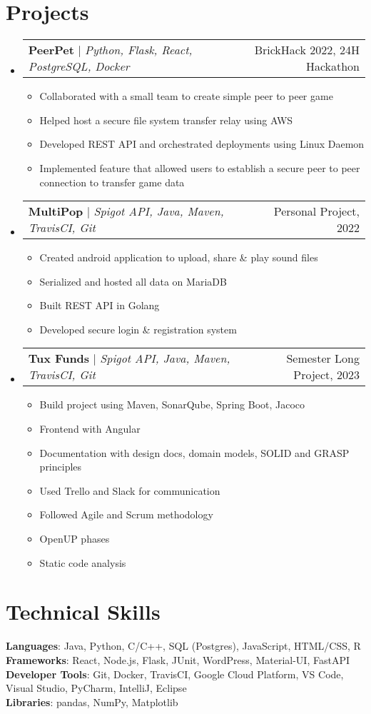 \documentclass[letterpaper,11pt]{article}
\makeatletter
\newcommand{\resumeItem}[1]{
  \item\small{
    {#1 \vspace{-2pt}}
  }
}
\newcommand{\resumeProjectHeading}[2]{
    \item
    \begin{tabular*}{0.97\textwidth}{l@{\extracolsep{\fill}}r}
      \small#1 & #2 \\
    \end{tabular*}\vspace{-7pt}
}
\newcommand{\resumeSubHeadingListStart}{\begin{itemize}[leftmargin=0.15in, label={}]}
\newcommand{\resumeSubHeadingListEnd}{\end{itemize}}
\newcommand{\resumeItemListStart}{\begin{itemize}}
\newcommand{\resumeItemListEnd}{\end{itemize}\vspace{-5pt}}
\makeatother
\begin{document}
\section{Projects}
\resumeSubHeadingListStart
    \resumeProjectHeading
        {\textbf{PeerPet} $|$ \emph{Python, Flask, React, PostgreSQL, Docker}}{BrickHack 2022, 24H Hackathon}
    \resumeItemListStart
        \resumeItem{Collaborated with a small team to create simple peer to peer game}
        \resumeItem{Helped host a secure file system transfer relay using AWS}
        \resumeItem{Developed REST API and orchestrated deployments using Linux Daemon}
        \resumeItem{Implemented feature that allowed users to establish a secure peer to peer connection to transfer game data}
    \resumeItemListEnd
    \resumeProjectHeading
        {\textbf{MultiPop} $|$ \emph{Spigot API, Java, Maven, TravisCI, Git}}{Personal Project, 2022}
    \resumeItemListStart
        \resumeItem{Created android application to upload, share & play sound files}
        \resumeItem{Serialized and hosted all data on MariaDB}
        \resumeItem{Built REST API in Golang}
        \resumeItem{Developed secure login & registration system}
    \resumeItemListEnd
    \resumeProjectHeading
        {\textbf{Tux Funds} $|$ \emph{Spigot API, Java, Maven, TravisCI, Git}}{Semester Long Project, 2023}
    \resumeItemListStart
        \resumeItem{Build project using Maven, SonarQube, Spring Boot, Jacoco}
        \resumeItem{Frontend with Angular}
        \resumeItem{Documentation with design docs, domain models, SOLID and GRASP principles}
        \resumeItem{Used Trello and Slack for communication}
        \resumeItem{Followed Agile and Scrum methodology}
        \resumeItem{OpenUP phases}
        \resumeItem{Static code analysis}
    \resumeItemListEnd
\resumeSubHeadingListEnd



%
\section{Technical Skills}
 \begin{itemize}[leftmargin=0.15in, label={}]
    \small{\item{
     \textbf{Languages}{: Java, Python, C/C++, SQL (Postgres), JavaScript, HTML/CSS, R} \\
     \textbf{Frameworks}{: React, Node.js, Flask, JUnit, WordPress, Material-UI, FastAPI} \\
     \textbf{Developer Tools}{: Git, Docker, TravisCI, Google Cloud Platform, VS Code, Visual Studio, PyCharm, IntelliJ, Eclipse} \\
     \textbf{Libraries}{: pandas, NumPy, Matplotlib}
    }}
 \end{itemize}


\end{document}
